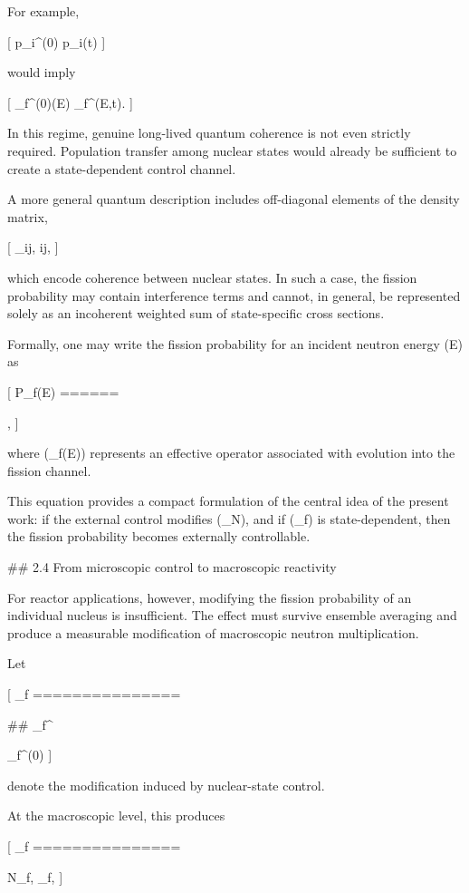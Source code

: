 For example,

[
p_i^{(0)}
\rightarrow
p_i(t)
]

would imply

[
\sigma_f^{(0)}(E)
\rightarrow
\sigma_f^{}(E,t).
]

In this regime, genuine long-lived quantum coherence is not even strictly required. Population transfer among nuclear states would already be sufficient to create a state-dependent control channel.

A more general quantum description includes off-diagonal elements of the density matrix,

[
\rho_{ij},
\qquad i\neq j,
]

which encode coherence between nuclear states. In such a case, the fission probability may contain interference terms and cannot, in general, be represented solely as an incoherent weighted sum of state-specific cross sections.

Formally, one may write the fission probability for an incident neutron energy (E) as

[
P_f(E)
======

,
]

where (\hat{\Pi}_f(E)) represents an effective operator associated with evolution into the fission channel.

This equation provides a compact formulation of the central idea of the present work: if the external control modifies (\rho_N), and if (\hat{\Pi}_f) is state-dependent, then the fission probability becomes externally controllable.

## 2.4 From microscopic control to macroscopic reactivity

For reactor applications, however, modifying the fission probability of an individual nucleus is insufficient. The effect must survive ensemble averaging and produce a measurable modification of macroscopic neutron multiplication.

Let

[
\delta \sigma_f
===============

## \sigma_f^{}

\sigma_f^{(0)}
]

denote the modification induced by nuclear-state control.

At the macroscopic level, this produces

[
\delta \Sigma_f
===============

N_f,
\delta \sigma_f,
]

